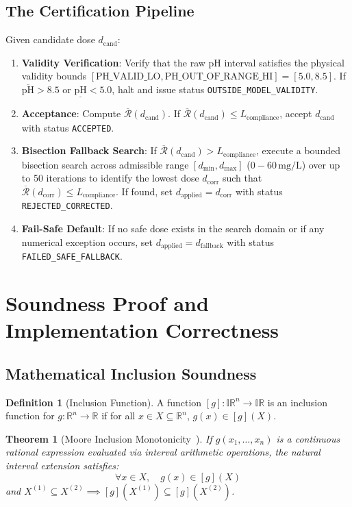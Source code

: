\documentclass[10pt,twocolumn,letterpaper]{article}
\newtheorem{theorem}{Theorem}
\theoremstyle{definition}
\newtheorem{definition}{Definition}
\newcommand{\IR}{\mathbb{IR}}
\newcommand{\R}{\mathbb{R}}
\newcommand{\Rbar}{\overline{\mathcal{R}}}
\newcommand{\Lcomp}{L_{\text{compliance}}}
\begin{document}
\subsection{The Certification Pipeline}
Given candidate dose $d_{\text{cand}}$:
\begin{enumerate}
    \item \textbf{Validity Verification}: Verify that the raw pH interval satisfies the physical validity bounds $[\text{PH\_VALID\_LO}, \text{PH\_OUT\_OF\_RANGE\_HI}] = [5.0, 8.5]$. If $\overline{\text{pH}} > 8.5$ or $\underline{\text{pH}} < 5.0$, halt and issue status \texttt{OUTSIDE\_MODEL\_VALIDITY}.
    \item \textbf{Acceptance}: Compute $\Rbar(d_{\text{cand}})$. If $\Rbar(d_{\text{cand}}) \le \Lcomp$, accept $d_{\text{cand}}$ with status \texttt{ACCEPTED}.
    \item \textbf{Bisection Fallback Search}: If $\Rbar(d_{\text{cand}}) > \Lcomp$, execute a bounded bisection search across admissible range $[d_{\min}, d_{\max}]$ ($0 - 60\,\text{mg/L}$) over up to 50 iterations to identify the lowest dose $d_{\text{corr}}$ such that $\Rbar(d_{\text{corr}}) \le \Lcomp$. If found, set $d_{\text{applied}} = d_{\text{corr}}$ with status \texttt{REJECTED\_CORRECTED}.
    \item \textbf{Fail-Safe Default}: If no safe dose exists in the search domain or if any numerical exception occurs, set $d_{\text{applied}} = d_{\text{fallback}}$ with status \texttt{FAILED\_SAFE\_FALLBACK}.
\end{enumerate}

\section{Soundness Proof and Implementation Correctness}

\subsection{Mathematical Inclusion Soundness}
\begin{definition}[Inclusion Function]
A function $[g]: \IR^n \to \IR$ is an inclusion function for $g: \R^n \to \R$ if for all $x \in X \subseteq \R^n$, $g(x) \in [g](X)$.
\end{definition}

\begin{theorem}[Moore Inclusion Monotonicity~\cite{moore1966interval}]
If $g(x_1, \dots, x_n)$ is a continuous rational expression evaluated via interval arithmetic operations, the natural interval extension satisfies:
\begin{equation}
\forall x \in X, \quad g(x) \in [g](X)
\end{equation}
and $X^{(1)} \subseteq X^{(2)} \implies [g](X^{(1)}) \subseteq [g](X^{(2)})$.
\end{theorem}
\end{document}
